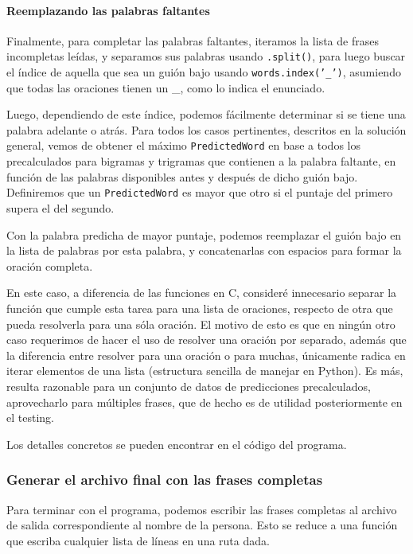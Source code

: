 \documentclass[a4paper]{article}
\begin{document}
\paragraph{Reemplazando las palabras faltantes}

Finalmente, para completar las palabras faltantes, iteramos la lista de frases incompletas leídas, y separamos sus palabras usando \texttt{.split()}, para luego buscar el índice de aquella que sea un guión bajo usando \texttt{words.index('_')}, asumiendo que todas las oraciones tienen un \_, como lo indica el enunciado. 

Luego, dependiendo de este índice, podemos fácilmente determinar si se tiene una palabra adelante o atrás. Para todos los casos pertinentes, descritos en la solución general, vemos de obtener el máximo \texttt{PredictedWord} en base a todos los precalculados para bigramas y trigramas que contienen a la palabra faltante, en función de las palabras disponibles antes y después de dicho guión bajo. Definiremos que un \texttt{PredictedWord} es mayor que otro si el puntaje del primero supera el del segundo. 

Con la palabra predicha de mayor puntaje, podemos reemplazar el guión bajo en la lista de palabras por esta palabra, y concatenarlas con espacios para formar la oración completa.

En este caso, a diferencia de las funciones en C, consideré innecesario separar la función que cumple esta tarea para una lista de oraciones, respecto de otra que pueda resolverla para una sóla oración. El motivo de esto es que en ningún otro caso requerimos de hacer el uso de resolver una oración por separado, además que la diferencia entre resolver para una oración o para muchas, únicamente radica en iterar elementos de una lista (estructura sencilla de manejar en Python). Es más, resulta razonable para un conjunto de datos de predicciones precalculados, aprovecharlo para múltiples frases, que de hecho es de utilidad posteriormente en el testing.

Los detalles concretos se pueden encontrar en el código del programa.

\subsubsection{Generar el archivo final con las frases completas}

Para terminar con el programa, podemos escribir las frases completas al archivo de salida correspondiente al nombre de la persona. Esto se reduce a una función que escriba cualquier lista de líneas en una ruta dada.
\end{document}
